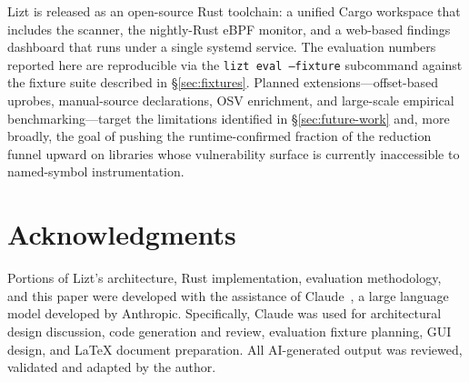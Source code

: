 \documentclass[conference]{IEEEtran}
\begin{document}
Lizt is released as an open-source Rust toolchain: a unified Cargo workspace that includes the scanner, the nightly-Rust eBPF monitor, and a web-based findings dashboard that runs under a single systemd service.
The evaluation numbers reported here are reproducible via the \texttt{lizt eval --fixture} subcommand against the fixture suite described in \S\ref{sec:fixtures}.
Planned extensions---offset-based uprobes, manual-source declarations, OSV enrichment, and large-scale empirical benchmarking---target the limitations identified in \S\ref{sec:future-work} and, more broadly, the goal of pushing the runtime-confirmed fraction of the reduction funnel upward on libraries whose vulnerability surface is currently inaccessible to named-symbol instrumentation.
\section*{Acknowledgments}

Portions of Lizt's architecture, Rust implementation, evaluation methodology, and this paper were developed with the assistance of Claude~\cite{claude}, a large language model developed by Anthropic.
Specifically, Claude was used for architectural design discussion, code generation and review, evaluation fixture planning, GUI design, and \LaTeX{} document preparation.
All AI-generated output was reviewed, validated and adapted by the author.

\clearpage



\end{document}
